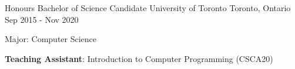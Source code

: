 
\begin{cventries}
  \cventry
    {Honours Bachelor of Science Candidate}
    {University of Toronto}
    {Toronto, Ontario}
    {Sep 2015 - Nov 2020}
    {
      \begin{cvitems}
        \item {Major: Computer Science}
        \item {\textbf{Teaching Assistant}: Introduction to Computer Programming (CSCA20)}
      \end{cvitems}
    }
\end{cventries}
